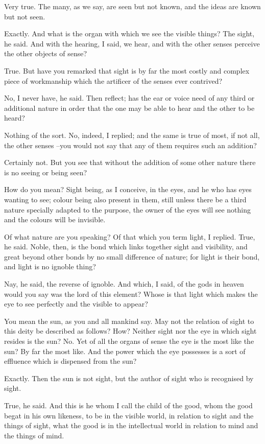 Very true.
The many, as we say, are seen but not known, and the ideas are known but not seen.

Exactly.
And what is the organ with which we see the visible things?
The sight, he said.
And with the hearing, I said, we hear, and with the other senses perceive the other objects of sense?

True.
But have you remarked that sight is by far the most costly and complex piece of workmanship which the artificer of the senses ever contrived?

No, I never have, he said.
Then reflect; has the ear or voice need of any third or additional nature in order that the one may be able to hear and the other to be heard?

Nothing of the sort.
No, indeed, I replied; and the same is true of most, if not all, the other senses --you would not say that any of them requires such an addition?

Certainly not.
But you see that without the addition of some other nature there is no seeing or being seen?

How do you mean?
Sight being, as I conceive, in the eyes, and he who has eyes wanting to see; colour being also present in them, still unless there be a third nature specially adapted to the purpose, the owner of the eyes will see nothing and the colours will be invisible.

Of what nature are you speaking?
Of that which you term light, I replied.
True, he said.
Noble, then, is the bond which links together sight and visibility, and great beyond other bonds by no small difference of nature; for light is their bond, and light is no ignoble thing?

Nay, he said, the reverse of ignoble.
And which, I said, of the gods in heaven would you say was the lord of this element? Whose is that light which makes the eye to see perfectly and the visible to appear?

You mean the sun, as you and all mankind say.
May not the relation of sight to this deity be described as follows?
How?
Neither sight nor the eye in which sight resides is the sun?
No.
Yet of all the organs of sense the eye is the most like the sun?
By far the most like.
And the power which the eye possesses is a sort of effluence which is dispensed from the sun?

Exactly.
Then the sun is not sight, but the author of sight who is recognised by sight.

True, he said.
And this is he whom I call the child of the good, whom the good begat in his own likeness, to be in the visible world, in relation to sight and the things of sight, what the good is in the intellectual world in relation to mind and the things of mind.

